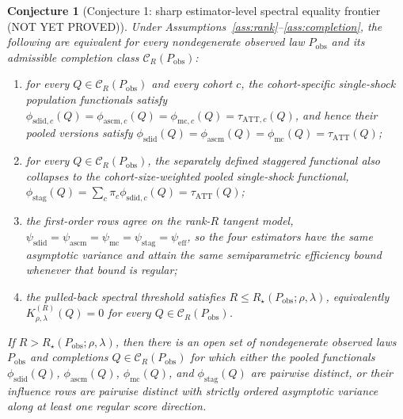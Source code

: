 \documentclass[11pt]{article}
\theoremstyle{definition}
\theoremstyle{plain}
\newtheorem{conjecture}{Conjecture}
\theoremstyle{remark}
\begin{document}
\begin{conjecture}[Conjecture 1: sharp estimator-level spectral equality frontier (NOT YET PROVED)]\label{conj:spectral-frontier}
Under Assumptions~\ref{ass:rank}--\ref{ass:completion}, the following are equivalent for every nondegenerate observed law \(P_{\mathrm{obs}}\) and its admissible completion class \(\mathcal C_R(P_{\mathrm{obs}})\):
\begin{enumerate}[label=(\roman*)]
\item for every \(Q\in\mathcal C_R(P_{\mathrm{obs}})\) and every cohort \(c\), the cohort-specific single-shock population functionals satisfy \(\phi_{\mathrm{sdid},c}(Q)=\phi_{\mathrm{ascm},c}(Q)=\phi_{\mathrm{mc},c}(Q)=\tau_{\mathrm{ATT},c}(Q)\), and hence their pooled versions satisfy \(\phi_{\mathrm{sdid}}(Q)=\phi_{\mathrm{ascm}}(Q)=\phi_{\mathrm{mc}}(Q)=\tau_{\mathrm{ATT}}(Q)\);
\item for every \(Q\in\mathcal C_R(P_{\mathrm{obs}})\), the separately defined staggered functional also collapses to the cohort-size-weighted pooled single-shock functional, \(\phi_{\mathrm{stag}}(Q)=\sum_c \pi_c \phi_{\mathrm{sdid},c}(Q)=\tau_{\mathrm{ATT}}(Q)\);
\item the first-order rows agree on the rank-\(R\) tangent model, \(\psi_{\mathrm{sdid}}=\psi_{\mathrm{ascm}}=\psi_{\mathrm{mc}}=\psi_{\mathrm{stag}}=\psi_{\mathrm{eff}}\), so the four estimators have the same asymptotic variance and attain the same semiparametric efficiency bound whenever that bound is regular;
\item the pulled-back spectral threshold satisfies \(R\le R_\star(P_{\mathrm{obs}};\rho,\lambda)\), equivalently \(K^{(R)}_{\rho,\lambda}(Q)=0\) for every \(Q\in\mathcal C_R(P_{\mathrm{obs}})\).
\end{enumerate}
If \(R>R_\star(P_{\mathrm{obs}};\rho,\lambda)\), then there is an open set of nondegenerate observed laws \(P_{\mathrm{obs}}\) and completions \(Q\in\mathcal C_R(P_{\mathrm{obs}})\) for which either the pooled functionals \(\phi_{\mathrm{sdid}}(Q)\), \(\phi_{\mathrm{ascm}}(Q)\), \(\phi_{\mathrm{mc}}(Q)\), and \(\phi_{\mathrm{stag}}(Q)\) are pairwise distinct, or their influence rows are pairwise distinct with strictly ordered asymptotic variance along at least one regular score direction.
\end{conjecture}
\end{document}
